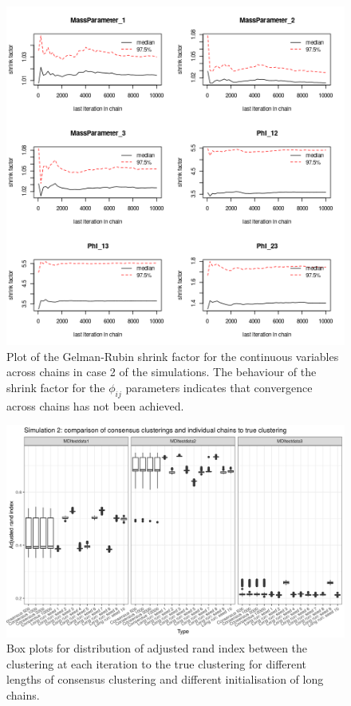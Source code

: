 \documentclass[14pt]{extarticle} %
\begin{document}
	
	\begin{figure}[!htb]
			\centering
			\includegraphics[scale=0.65]{Images/Gen_data/Case_2/Gelman_plot_burn_20000.png}
			\caption{Plot of the  Gelman-Rubin shrink factor for the continuous variables across chains in case 2 of the simulations. The behaviour of the shrink factor for the $\phi_{ij}$ parameters indicates that convergence across chains has not been achieved.}
			\label{fig:gen_data_case_2_gelman_plot}
		\end{figure}
	
	
		\begin{figure}
		\centering
		\includegraphics[scale=0.9]{Images/Gen_data/Case_2/box_plot_ari_true_clustering_burn_in.png}
		\caption{Box plots for distribution of adjusted rand index between the clustering at each iteration to the true clustering for different lengths of consensus clustering and different initialisation of long chains.}
		\label{fig:gen_data_case_2_boxplot}
	\end{figure}
\end{document}
